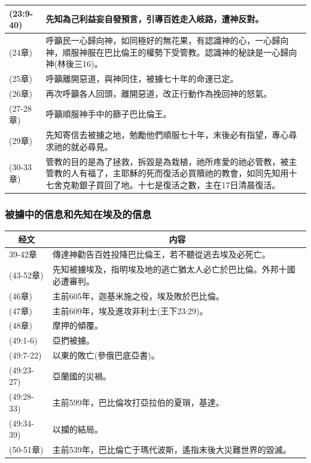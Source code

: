 \begin{table}[H]
\begin{tabular}{p{}|p{15.50cm}}
 (23:9-40)&先知為己利益妄自發預言，引導百姓走入岐路，遭神反對。\\\hline
 (24章)&呼籲民一心歸向神，如同極好的無花果，有認識神的心，一心歸向神，順服神服在巴比倫王的權勢下受管教。認識神的秘訣是一心歸向神(林後三16)。\\\hline 
(25章)&呼籲離開惡道，與神同住，被擄七十年的命運已定。\\\hline
 (26章)&再次呼籲各人回頭，離開惡道，改正行動作為挽回神的怒氣。\\\hline
(27-28章)&呼籲順服神手中的篩子巴比倫王。\\\hline
(29章)&先知寄信去被擄之地，勉勵他們順服七十年，末後必有指望，專心尋求祂的就必尋見。\\\hline
(30-33章)&管教的目的是為了拯救，拆毀是為栽植，祂所疼愛的祂必管教，被主管教的人有福了，主耶穌的死而復活必買贖祂的教會，如同先知用十七舍克勒銀子買回了地。十七是復活之數，主在17日清晨復活。\\\hline
\end{tabular}
\end{table}

\subsubsection{被擄中的信息和先知在埃及的信息}
\begin{table}[H]
\centering
\begin{tabular}{p{}|p{12.50cm}}\hline\hline
\multicolumn{1}{c|}{经文}&\multicolumn{1}{c}{内容}\\\hline
39-42章&傳達神勸告百姓投降巴比倫王，若不聽從逃去埃及必死亡。\\\hline
 (43-52章)&先知被擄埃及，指明埃及地的逃亡猶太人必亡於巴比倫。外邦十國必遭審判。\\\hline
 (46章)&主前605年，迦基米施之役，埃及敗於巴比倫。\\\hline
 (47章)&主前609年，埃及進攻非利士(王下23:29)。\\\hline
 (48章)&摩押的傾覆。\\\hline
 (49:1-6)&亞捫被擄。\\\hline
 (49:7-22)&以東的敗亡(參俄巴底亞書)。\\\hline
 (49:23-27)&亞蘭國的災禍。\\\hline
 (49:28-33)&主前599年，巴比倫攻打亞拉伯的夏瑣，基達。\\\hline
 (49:34-39)&以攔的結局。\\\hline 
(50-51章)&主前539年，巴比倫亡于瑪代波斯，遙指末後大災難世界的毀滅。\\\hline
\end{tabular}
\end{table}
 

